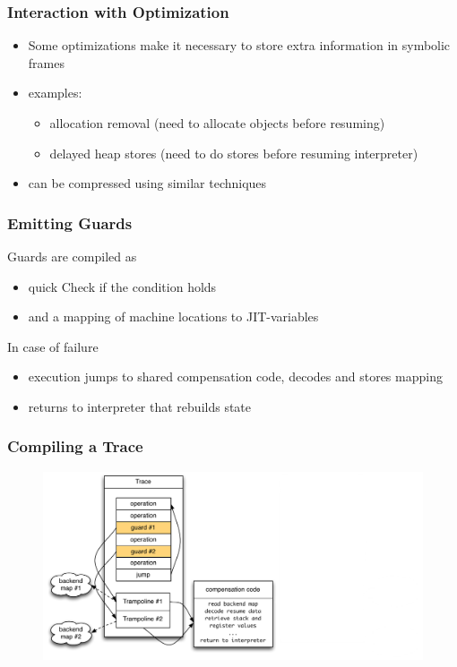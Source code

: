 \documentclass[utf8x]{beamer}
\begin{document}
\begin{frame}
  \frametitle{Interaction with Optimization}
  \begin{itemize}
      \item Some optimizations make it necessary to store extra information in symbolic frames
      \pause
      \item examples:
          \begin{itemize}
              \item allocation removal (need to allocate objects before resuming)
              \item delayed heap stores (need to do stores before resuming interpreter)
          \end{itemize}
      \item can be compressed using similar techniques
  \end{itemize}
\end{frame}

\begin{frame}
  \frametitle{Emitting Guards}
  Guards are compiled as
  \begin{itemize}
    \item quick Check if the condition holds
    \item and a mapping of machine locations to JIT-variables %
  \end{itemize}
  \pause
  In case of failure
  \begin{itemize}
    \item execution jumps to shared compensation code, decodes and stores mapping
    \item returns to interpreter that rebuilds state
  \end{itemize}
\end{frame}

\begin{frame}
  \frametitle{Compiling a Trace}
  \begin{figure}
  \centering
  \includegraphics[width=1\textwidth]{figures/loop.pdf}
  \end{figure}
\end{frame}
\end{document}
